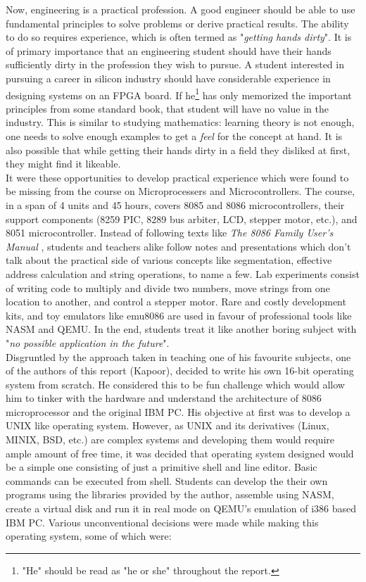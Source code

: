 Now, engineering is a practical profession. A good engineer should be able to use fundamental principles to solve problems or derive practical results. The ability to do so requires experience, which is often termed as "\textit{getting hands dirty}". It is of primary importance that an engineering student should have their hands sufficiently dirty in the profession they wish to pursue. A student interested in pursuing a career in silicon industry should have considerable experience in designing systems on an FPGA board. If he\footnote[1]{"He" should be read as "he or she" throughout the report.} has only memorized the important principles from some standard book, that student will have no value in the industry. This is similar to studying mathematics: learning theory is not enough, one needs to solve enough examples to get a \textit{feel} for the concept at hand. It is also possible that while getting their hands dirty in a field they disliked at first, they might find it likeable.\\
It were these opportunities to develop practical experience which were found to be missing from the course on Microprocessers and Microcontrollers. The course, in a span of 4 units and 45 hours, covers 8085 and 8086 microcontrollers, their support components (8259 PIC, 8289 bus arbiter, LCD, stepper motor, etc.), and 8051 microcontroller. Instead of following texts like \textit{The 8086 Family User's Manual} \cite{intel1979the}, students and teachers alike follow notes and presentations which don't talk about the practical side of various concepts like segmentation, effective address calculation and string operations, to name a few. Lab experiments consist of writing code to multiply and divide two numbers, move strings from one location to another, and control a stepper motor. Rare and costly development kits, and toy emulators like emu8086 are used in favour of professional tools like NASM and QEMU. In the end, students treat it like another boring subject with "\textit{no possible application in the future}".\\
Disgruntled by the approach taken in teaching one of his favourite subjects, one of the authors of this report (Kapoor), decided to write his own 16-bit operating system from scratch. He considered this to be fun challenge which would allow him to tinker with the hardware and understand the architecture of 8086 microprocessor and the original IBM PC. His objective at first was to develop a UNIX like operating system. However, as UNIX and its derivatives (Linux, MINIX, BSD, etc.) are complex systems and developing them would require ample amount of free time, it was decided that operating system designed would be a simple one consisting of just a primitive shell and line editor. Basic commands can be executed from shell. Students can develop the their own programs using the libraries provided by the author, assemble using NASM, create a virtual disk and run it in real mode on QEMU's emulation of i386 based IBM PC. Various unconventional decisions were made while making this operating system, some of which were:
